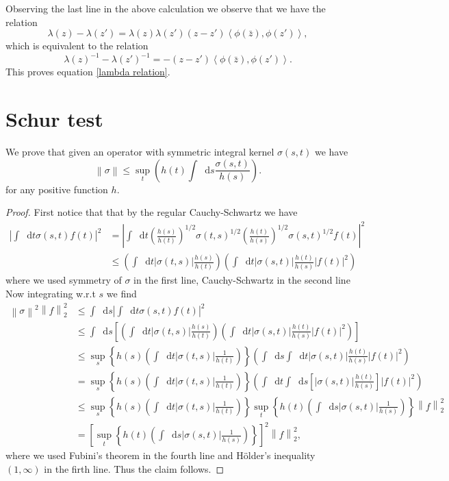 \documentclass[a4paper,11pt]{article}
\newcommand{\norm}[1]{\left\lVert #1 \right\rVert}
\newcommand{\abs}[1]{\left\lvert #1 \right\rvert}
\renewcommand{\braket}[1]{\left\langle#1\right\rangle}
\newcommand*\diff{\mathop{}\!\mathrm{d}}
\numberwithin{equation}{section}
\begin{document}
Observing the last line in the above calculation we observe that we have the relation\begin{equation}
\lambda(z)-\lambda(z')=\lambda(z)\lambda(z')(z-z')\braket{\phi(\bar{z}),\phi(z')},
\end{equation}
which is equivalent to the relation\begin{equation}
\lambda(z)^{-1}-\lambda(z')^{-1}=-(z-z')\braket{\phi(\bar{z}),\phi(z')}.
\end{equation}
This proves equation \eqref{lambda relation}.
\section{Schur test}
We prove that given an operator with symmetric integral kernel $ \sigma(s,t) $ we have\begin{equation}
\norm{\sigma}\leq\sup_{t}\left(h(t)\int\diff s \frac{\sigma(s,t)}{h(s)}\right).
\end{equation}
for any positive function $ h $.
\begin{proof}
	First notice that that by the regular Cauchy-Schwartz we have \begin{equation}
	\begin{aligned}
	\abs{\int\diff t\sigma(s,t)f(t)}^2&=\abs{\int\diff t\left(\frac{h(s)}{h(t)}\right)^{1/2}\sigma(t,s)^{1/2}\left(\frac{h(t)}{h(s)}\right)^{1/2}\sigma(s,t)^{1/2}f(t)}^2\\
	&\leq \left(\int\diff t \abs{\sigma(t,s)}\frac{h(s)}{h(t)}\right)\left(\int\diff t \abs{\sigma(s,t)}\frac{h(t)}{h(s)}\abs{f(t)}^2\right)
	\end{aligned}
	\end{equation}
	where we used symmetry of $ \sigma $ in the first line, Cauchy-Schwartz in the second line Now integrating w.r.t $ s $ we find\begin{equation}
	\begin{aligned}
	\norm{\sigma}^2\norm{f}_2^2&\leq\int\diff s	\abs{\int\diff t\sigma(s,t)f(t)}^2\\&
	\leq\int\diff s\left[\left(\int\diff t \abs{\sigma(t,s)}\frac{h(s)}{h(t)}\right)\left(\int\diff t \abs{\sigma(s,t)}\frac{h(t)}{h(s)}\abs{f(t)}^2\right)\right]\\&
	\leq\sup_{s}\left\{h(s)\left(\int\diff t \abs{\sigma(t,s)}\frac{1}{h(t)}\right)\right\}\left(\int\diff s\int\diff t \abs{\sigma(s,t)}\frac{h(t)}{h(s)}\abs{f(t)}^2\right)
	\\&
	=\sup_{s}\left\{h(s)\left(\int\diff t \abs{\sigma(t,s)}\frac{1}{h(t)}\right)\right\}\left(\int\diff t\int\diff s\left[ \abs{\sigma(s,t)}\frac{h(t)}{h(s)}\right]\abs{f(t)}^2\right)
	\\&
	\leq\sup_{s}\left\{h(s)\left(\int\diff t \abs{\sigma(t,s)}\frac{1}{h(t)}\right)\right\}\sup_{t}\left\{h(t)\left(\int\diff s \abs{\sigma(s,t)}\frac{1}{h(s)}\right)\right\}\norm{f}^2_2
	\\&=\left[\sup_{t}\left\{h(t)\left(\int\diff s \abs{\sigma(s,t)}\frac{1}{h(s)}\right)\right\}\right]^2\norm{f}^2_2,
	\end{aligned}
	\end{equation}
	where we used Fubini's theorem in the fourth line and H\"older's inequality $ (1,\infty) $ in the firth line.
	Thus the claim follows.
\end{proof}
\end{document}
